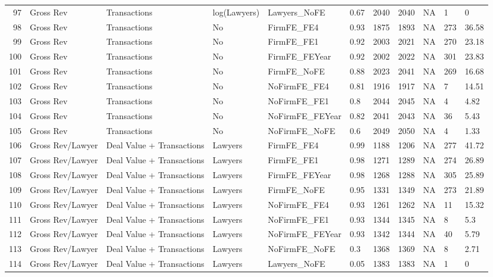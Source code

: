 \documentclass{article}
\begin{document}
\begin{table}[H]
\begin{tabular}{rllllllllll}
  97 & Gross Rev & Transactions & log(Lawyers) & Lawyers\_NoFE & 0.67 & 2040 & 2040 & NA & 1 & 0 \\ 
  98 & Gross Rev & Transactions & No & FirmFE\_FE4 & 0.93 & 1875 & 1893 & NA & 273 & 36.58 \\ 
  99 & Gross Rev & Transactions & No & FirmFE\_FE1 & 0.92 & 2003 & 2021 & NA & 270 & 23.18 \\ 
  100 & Gross Rev & Transactions & No & FirmFE\_FEYear & 0.92 & 2002 & 2022 & NA & 301 & 23.83 \\ 
  101 & Gross Rev & Transactions & No & FirmFE\_NoFE & 0.88 & 2023 & 2041 & NA & 269 & 16.68 \\ 
  102 & Gross Rev & Transactions & No & NoFirmFE\_FE4 & 0.81 & 1916 & 1917 & NA & 7 & 14.51 \\ 
  103 & Gross Rev & Transactions & No & NoFirmFE\_FE1 & 0.8 & 2044 & 2045 & NA & 4 & 4.82 \\ 
  104 & Gross Rev & Transactions & No & NoFirmFE\_FEYear & 0.82 & 2041 & 2043 & NA & 36 & 5.43 \\ 
  105 & Gross Rev & Transactions & No & NoFirmFE\_NoFE & 0.6 & 2049 & 2050 & NA & 4 & 1.33 \\ 
  106 & Gross Rev/Lawyer & Deal Value + Transactions & Lawyers & FirmFE\_FE4 & 0.99 & 1188 & 1206 & NA & 277 & 41.72 \\ 
  107 & Gross Rev/Lawyer & Deal Value + Transactions & Lawyers & FirmFE\_FE1 & 0.98 & 1271 & 1289 & NA & 274 & 26.89 \\ 
  108 & Gross Rev/Lawyer & Deal Value + Transactions & Lawyers & FirmFE\_FEYear & 0.98 & 1268 & 1288 & NA & 305 & 25.89 \\ 
  109 & Gross Rev/Lawyer & Deal Value + Transactions & Lawyers & FirmFE\_NoFE & 0.95 & 1331 & 1349 & NA & 273 & 21.89 \\ 
  110 & Gross Rev/Lawyer & Deal Value + Transactions & Lawyers & NoFirmFE\_FE4 & 0.93 & 1261 & 1262 & NA & 11 & 15.32 \\ 
  111 & Gross Rev/Lawyer & Deal Value + Transactions & Lawyers & NoFirmFE\_FE1 & 0.93 & 1344 & 1345 & NA & 8 & 5.3 \\ 
  112 & Gross Rev/Lawyer & Deal Value + Transactions & Lawyers & NoFirmFE\_FEYear & 0.93 & 1342 & 1344 & NA & 40 & 5.79 \\ 
  113 & Gross Rev/Lawyer & Deal Value + Transactions & Lawyers & NoFirmFE\_NoFE & 0.3 & 1368 & 1369 & NA & 8 & 2.71 \\ 
  114 & Gross Rev/Lawyer & Deal Value + Transactions & Lawyers & Lawyers\_NoFE & 0.05 & 1383 & 1383 & NA & 1 & 0 \\ 

\end{tabular}
\end{table}
\end{document}
